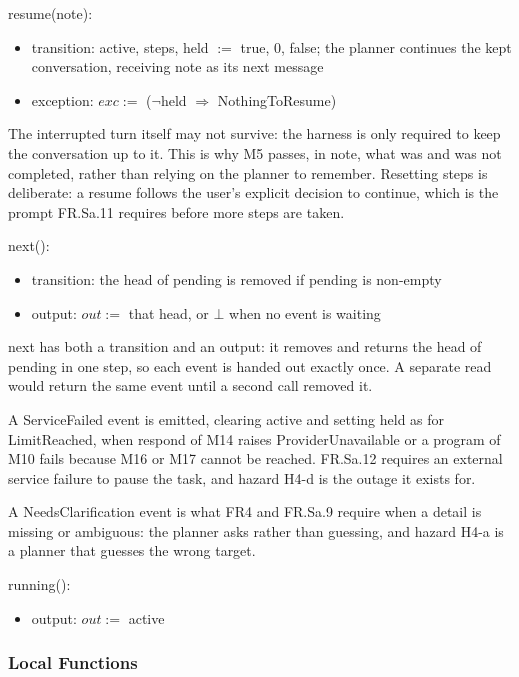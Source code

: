 \documentclass[12pt, titlepage]{article}
\newcommand{\nil}{\bot}
\begin{document}
\noindent resume(note):
\begin{itemize}
\item transition: active, steps, held $:=$ true, 0, false; the planner continues
the kept conversation, receiving note as its next message
\item exception: $exc :=$ ($\lnot$held $\Rightarrow$ NothingToResume)
\end{itemize}

\noindent The interrupted turn itself may not survive: the harness is only
required to keep the conversation up to it. This is why M5 passes, in note, what
was and was not completed, rather than relying on the planner to remember.
Resetting steps is deliberate: a resume follows the user's explicit decision to
continue, which is the prompt FR.Sa.11 requires before more steps are taken.

\noindent next():
\begin{itemize}
\item transition: the head of pending is removed if pending is non-empty
\item output: $out :=$ that head, or $\nil$ when no event is waiting
\end{itemize}

\noindent next has both a transition and an output: it removes and returns the
head of pending in one step, so each event is handed out exactly once. A
separate read would return the same event until a second call removed it.

\noindent A ServiceFailed event is emitted, clearing active and setting held as
for LimitReached, when respond of M14 raises ProviderUnavailable or a program of
M10 fails because M16 or M17 cannot be reached. FR.Sa.12 requires an external
service failure to pause the task, and hazard H4-d is the outage it exists for.

\noindent A NeedsClarification event is what FR4 and FR.Sa.9 require when a
detail is missing or ambiguous: the planner asks rather than guessing, and
hazard H4-a is a planner that guesses the wrong target.

\noindent running():
\begin{itemize}
\item output: $out :=$ active
\end{itemize}

\subsubsection{Local Functions}
\end{document}
